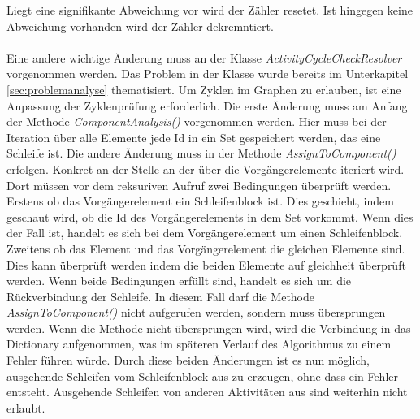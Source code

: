     Liegt eine signifikante Abweichung vor wird der Zähler resetet. Ist hingegen keine Abweichung vorhanden wird der Zähler dekremntiert.\\
    \\
    Eine andere wichtige Änderung muss an der Klasse \textit{ActivityCycleCheckResolver} vorgenommen werden. 
    Das Problem in der Klasse wurde bereits im Unterkapitel \cref{sec:problemanalyse} thematisiert.
    Um Zyklen im Graphen zu erlauben, ist eine Anpassung der Zyklenprüfung erforderlich.
    Die erste Änderung muss am Anfang der Methode \textit{ComponentAnalysis()} vorgenommen werden.
    Hier muss bei der Iteration über alle Elemente jede Id in ein Set gespeichert werden, das eine Schleife ist.
    Die andere Änderung muss in der Methode \textit{AssignToComponent()} erfolgen.
    Konkret an der Stelle an der über die Vorgängerelemente iteriert wird.
    Dort müssen vor dem reksuriven Aufruf zwei Bedingungen überprüft werden.
    Erstens ob das Vorgängerelement ein Schleifenblock ist.
    Dies geschieht, indem geschaut wird, ob die Id des Vorgängerelements in dem Set vorkommt. 
    Wenn dies der Fall ist, handelt es sich bei dem Vorgängerelement um einen Schleifenblock.
    Zweitens ob das Element und das Vorgängerelement die gleichen Elemente sind.
    Dies kann überprüft werden indem die beiden Elemente auf gleichheit überprüft werden.
    Wenn beide Bedingungen erfüllt sind, handelt es sich um die Rückverbindung der Schleife. 
    In diesem Fall darf die Methode \textit{AssignToComponent()} nicht aufgerufen werden, sondern muss übersprungen werden.
    Wenn die Methode nicht übersprungen wird, wird die Verbindung in das Dictionary aufgenommen, was im späteren Verlauf des Algorithmus zu einem Fehler führen würde.
    Durch diese beiden Änderungen ist es nun möglich, ausgehende Schleifen vom Schleifenblock aus zu erzeugen, ohne dass ein Fehler entsteht.
    Ausgehende Schleifen von anderen Aktivitäten aus sind weiterhin nicht erlaubt.
